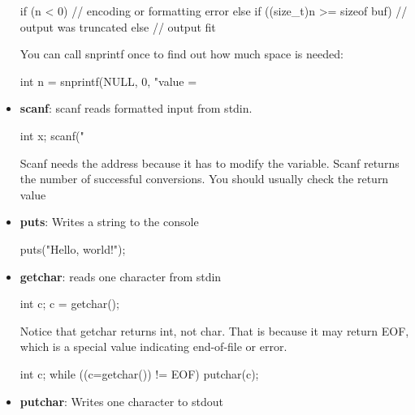 \documentclass{report}
\begin{document}
\begin{itemize}
\begin{cppcode}
                if (n < 0) {
                    // encoding or formatting error
                } else if ((size_t)n >= sizeof buf) {
                    // output was truncated
                } else {
                    // output fit
                }
            \end{cppcode}
            \bigbreak \noindent 
            You can call snprintf once to find out how much space is needed:
            \bigbreak \noindent 
            \begin{cppcode}
                int n = snprintf(NULL, 0, "value = %
            \end{cppcode}
        \item \textbf{scanf}: scanf reads formatted input from stdin.
            \bigbreak \noindent 
            \begin{cppcode}
            int x;
            scanf("%
            \end{cppcode}
            \bigbreak \noindent 
            Scanf needs the address because it has to modify the variable. Scanf returns the number of successful conversions. You should usually check the return value
            \bigbreak \noindent 
        \item \textbf{puts}: Writes a string to the console
            \bigbreak \noindent 
            \begin{cppcode}
            puts("Hello, world!");
            \end{cppcode}
        \item \textbf{getchar}: reads one character from stdin
            \bigbreak \noindent 
            \begin{cppcode}
            int c;
            c = getchar();
            \end{cppcode}
            \bigbreak \noindent 
            Notice that getchar returns int, not char. That is because it may return EOF, which is a special value indicating end-of-file or error.
            \bigbreak \noindent 
            \begin{cppcode}
            int c;
            while ((c=getchar()) != EOF) putchar(c);
            \end{cppcode}
        \item \textbf{putchar}: Writes one character to stdout

\end{itemize}
\end{document}

